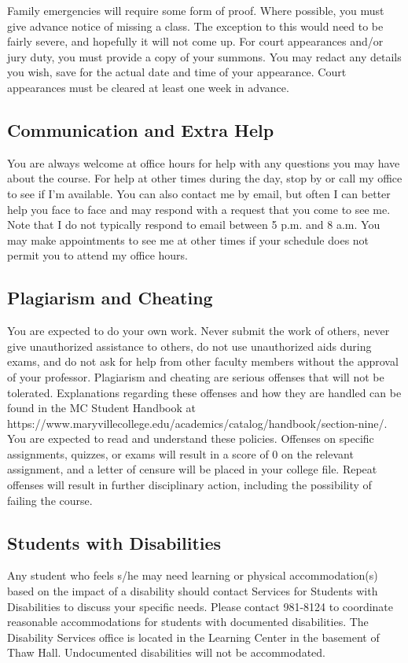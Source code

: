 \documentclass[11pt]{article}
\begin{document}
Family emergencies will require some form of proof. Where possible,
you must give advance notice of missing a class. The exception to this
would need to be fairly severe, and hopefully it will not come up.
For court appearances and/or jury duty, you must provide a copy of
your summons. You may redact any details you wish, save for the
actual date and time of your appearance. Court appearances must be
cleared at least one week in advance.

\subsection*{Communication and Extra Help}
You are always welcome at office hours for help with any
questions you may have about the course. For help at other times during the day, stop by or call my office to see if I'm available. You can also contact me by email, but often I can better help you face to face and may respond with a request that
you come to see me. Note that I do not typically respond to email between 5 p.m. and 8 a.m. You may make appointments to see me at other times if your schedule does not permit you to attend my office hours.


\subsection*{Plagiarism and Cheating}
You are expected to do your own work. Never submit the work of others,
never give unauthorized assistance to others, do not use unauthorized
aids during exams, and do not ask for help from other
faculty members without the approval of your professor. Plagiarism and cheating are serious offenses that will not be
tolerated. Explanations regarding these offenses and how they are handled can be found in the MC Student Handbook at\newline
https://www.maryvillecollege.edu/academics/catalog/handbook/section-nine/.\newline
You are expected to read and understand these policies. Offenses on specific assignments, quizzes, or exams will result
in a score of 0 on the relevant assignment, and a letter of censure will be placed in your college file. Repeat offenses will
result in further disciplinary action, including the possibility of failing the course.

\subsection*{Students with Disabilities}
Any student who feels s/he may need learning or physical
accommodation(s) based on the impact of a disability should contact Services for Students with Disabilities to discuss your
specific needs. Please contact 981-8124 to coordinate reasonable accommodations for students with documented
disabilities. The Disability Services office is located in the Learning Center in the basement of Thaw Hall. Undocumented
disabilities will not be accommodated.
\end{document}
